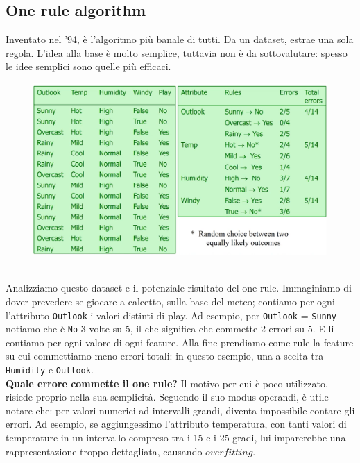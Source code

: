 \subsection{One rule algorithm}
Inventato nel '94, è l'algoritmo più banale di tutti. Da un dataset, estrae una sola regola. L'idea alla base è molto semplice, tuttavia non è da sottovalutare: spesso le idee semplici sono quelle più efficaci.
\\
\begin{figure}[th]
    \centering
    \includegraphics[scale=0.5]{ML/img/onerule.png}
\end{figure}
\\
Analizziamo questo dataset e il potenziale risultato del one rule. Immaginiamo di dover prevedere se giocare a calcetto, sulla base del meteo; contiamo per ogni l'attributo \texttt{Outlook} i valori distinti di play. Ad esempio, per \texttt{Outlook} = \texttt{Sunny} notiamo che è \texttt{No} 3 volte su 5, il che significa che commette 2 errori su 5. E li contiamo per ogni valore di ogni feature. Alla fine prendiamo come rule la feature su cui commettiamo meno errori totali: in questo esempio, una a scelta tra \texttt{Humidity} e \texttt{Outlook}.
\\
\textbf{Quale errore commette il one rule?} Il motivo per cui è poco utilizzato, risiede proprio nella sua semplicità. Seguendo il suo modus operandi, è utile notare che: per valori numerici ad intervalli grandi, diventa impossibile contare gli errori. Ad esempio, se aggiungessimo l'attributo temperatura, con tanti valori di temperature in un intervallo compreso tra i 15 e i 25 gradi, lui imparerebbe una rappresentazione troppo dettagliata, causando $overfitting$.

\newpage

